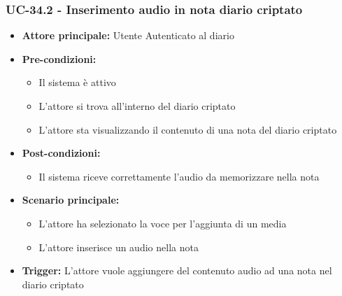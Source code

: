\documentclass[a4paper,12pt]{article}
\begin{document}
\subsubsection{UC-34.2 - Inserimento audio in nota diario criptato} \label{subsec:UC-34.2}
\begin{itemize}
    \item \textbf{Attore principale:} Utente Autenticato al diario
    \item \textbf{Pre-condizioni:}
    \begin{itemize}
        \item Il sistema è attivo
        \item L'attore si trova all'interno del diario criptato
        \item L'attore sta visualizzando il contenuto di una nota del diario criptato
    \end{itemize}
    \item \textbf{Post-condizioni:}
    \begin{itemize}
        \item Il sistema riceve correttamente l'audio da memorizzare nella nota
    \end{itemize}
    \item \textbf{Scenario principale:}
    \begin{itemize}
        \item L'attore ha selezionato la voce per l'aggiunta di un media
        \item L'attore inserisce un audio nella nota
    \end{itemize}
    \item \textbf{Trigger:} L'attore vuole aggiungere del contenuto audio ad una nota nel diario criptato
\end{itemize}
\end{document}
